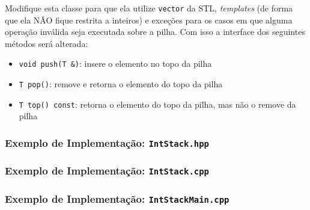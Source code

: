 \documentclass[xcolor={dvipsnames,table},aspectratio=169]{beamer}
\begin{document}
\begin{frame}
\begin{enumerate}
\begin{itemize}
	\end{itemize}
	Modifique esta classe para que ela utilize \texttt{vector} da STL, \emph{templates} (de forma que ela NÃO fique restrita a inteiros) e exceções para os casos em que alguma operação inválida seja executada sobre a pilha. Com isso a interface dos seguintes métodos será alterada:\\
	\begin{itemize}
		\tiny
		\item \texttt{void push(T \&)}: insere o elemento no topo da pilha
		\item \texttt{T pop()}: remove e retorna o elemento do topo da pilha
		\item \texttt{T top() const}: retorna o elemento do topo da pilha, mas não o remove da pilha
	\end{itemize}
\end{enumerate}
\end{frame}


\begin{frame}\frametitle{Exemplo de Implementação: \texttt{IntStack.hpp}}

\end{frame}

\begin{frame}\frametitle{Exemplo de Implementação: \texttt{IntStack.cpp}}
\fontsize{3pt}{5pt}\selectfont{

}
\end{frame}

\begin{frame}\frametitle{Exemplo de Implementação: \texttt{IntStackMain.cpp}}
\fontsize{5pt}{6pt}\selectfont{

}
\end{frame}

\end{document}
